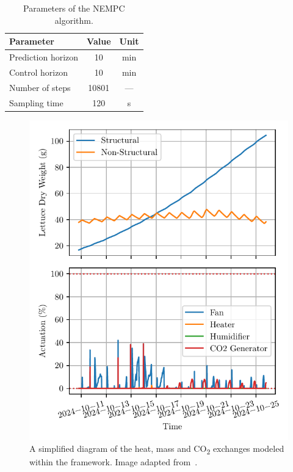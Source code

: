 \documentclass[conference]{IEEEtran}
\begin{document}
\begin{table}
    \centering
    \caption{Parameters of the NEMPC algorithm.}\label{tab:parameters}
    \begin{tabular}{lS[table-format=5.]c}
        \toprule
        Parameter          & {Value} & Unit \\
        \midrule
        Prediction horizon & 10      & min  \\
        Control horizon    & 10      & min  \\
        Number of steps    & 10801   & ---  \\
        Sampling time      & 120     & s    \\
        \bottomrule
    \end{tabular}
\end{table}

\begin{figure}\label{fig:control}
    \centering
    \includegraphics[width=.5\textwidth]{figures/greenhouse_control-mpc-N_5-steps_10801.pdf}
    \caption{A simplified diagram of the heat, mass and CO\textsubscript{2} exchanges modeled within the framework. Image adapted from~\cite{rmward61_2019}.}
\end{figure}
\end{document}
